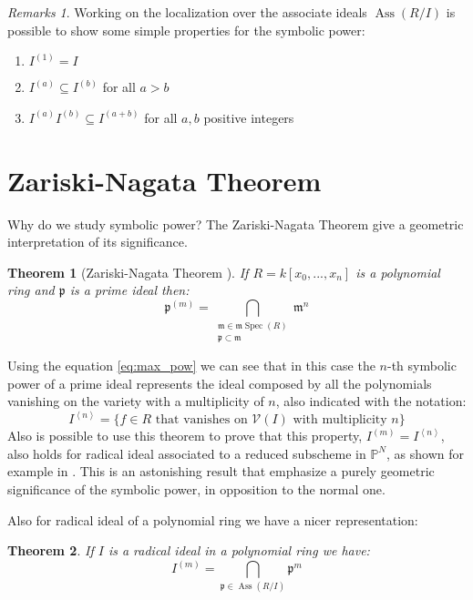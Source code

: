 \documentclass[notitlepage, a4]{book}
\theoremstyle{plain}
\newtheorem{teo}{Theorem}[section]
\theoremstyle{remark}
\newtheorem{rems}[rem]{Remarks}
\theoremstyle{definition}
\newcommand{\PP}{\mathbb{P}}
\newcommand{\p}{\mathfrak{p}}
\newcommand{\mm}{\mathfrak{m}}
\DeclareMathOperator{\Ass}{Ass}
\DeclareMathOperator{\Spec}{Spec}
\begin{document}
\begin{rems} \label{rem:symb_basic}
Working on the localization over the associate ideals $ \Ass(R/I) $ is possible to show some simple properties for the symbolic power:
\begin{enumerate}
\item $ I^{(1)}=I $
\item $ I^{(a)} \subseteq I^{(b)} $ for all $ a > b $
\item $ I^{(a)}I^{(b)}\subseteq I^{(a+b)} $ for all $ a,b $ positive integers
\end{enumerate}
\end{rems}



\section{Zariski-Nagata Theorem}
Why do we study symbolic power? The Zariski-Nagata Theorem give a geometric interpretation of its significance.

\begin{teo}[Zariski-Nagata Theorem \cite{Zar49, Nagata62}] \label{teo:zarnaga}
	If $ R = k[x_0 , ... , x_n] $ is a polynomial ring and $ \p $ is a prime ideal then:
	\begin{equation}\label{eq:zar_nag_teo}
	\p^{(m)} = \bigcap_{\substack{ \mm \in \mm\Spec (R)\\ \p \subset \mm}} \mm ^n
	\end{equation}
\end{teo}

Using the equation \ref{eq:max_pow} we can see that in this case the $ n $-th symbolic power of a prime ideal represents the ideal composed by all the polynomials vanishing on the variety with a multiplicity of $ n $, also indicated with the notation:
\begin{equation}\label{eq:ideal_vanish}
	I^{\left<n\right>} = \{ f \in R \text{ that vanishes on } \mathcal{V}(I) \text{ with multiplicity } n\}
\end{equation}
Also is possible to use this theorem to prove that this property, $ I^{(m)} = I^{\left<n\right>} $, also holds for radical ideal associated to a reduced subscheme in $ \PP ^N $, as shown for example in \cite[Corollary 2.9]{Sid09}.
This is an astonishing result that emphasize a purely geometric significance of the symbolic power, in opposition to the normal one. 

Also for radical ideal of a polynomial ring we have a nicer representation:
\begin{teo}\label{teo:sym_radical}
If $ I $ is a radical ideal in a polynomial ring we have:
\begin{equation}
		I^{(m)} = \bigcap_{\p \in \Ass(R/I) } \p^m
	\end{equation}
\end{teo}
\end{document}

